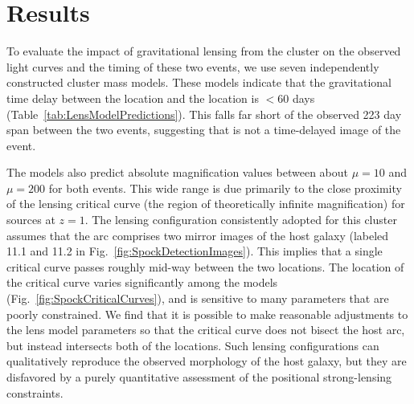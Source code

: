 \section{Results}\label{sec:Results}

To evaluate the impact of gravitational lensing from the 
cluster on the observed light curves and the timing of these two
events, we use seven independently constructed cluster mass models.
These models indicate that the gravitational time delay between the
\spockone location and the \spocktwo location is $<$60 days
(Table~\ref{tab:LensModelPredictions}).  This falls far short of the
observed 223 day span between the two events, suggesting that
\spocktwo is not a time-delayed image of the \spockone event.

The models also predict absolute magnification values between about
$\mu=10$ and $\mu=200$ for both events. This wide range is due
primarily to the close proximity of the lensing critical curve (the
region of theoretically infinite magnification) for sources at $z=1$.
The lensing configuration consistently adopted for this cluster
assumes that the arc comprises two mirror images of the host galaxy
(labeled 11.1 and 11.2 in
Fig.~\ref{fig:SpockDetectionImages})\cite{Zitrin:2013a, Jauzac:2014,
  Johnson:2014, Richard:2014, Diego:2015a, Grillo:2015, Hoag:2016,
  Sebesta:2016, Caminha:2017}.  This implies that a single critical
curve passes roughly mid-way between the two \spock locations.  The
location of the critical curve varies significantly among the models
(Fig.~\ref{fig:SpockCriticalCurves}), and is sensitive to many
parameters that are poorly constrained. We find that it is possible to
make reasonable adjustments to the lens model parameters so that the
critical curve does not bisect the \spock host arc, but instead
intersects both of the \spock locations.  Such lensing configurations
can qualitatively reproduce the observed morphology of the \spock host
galaxy, but they are disfavored by a purely quantitative assessment of
the positional strong-lensing constraints.

